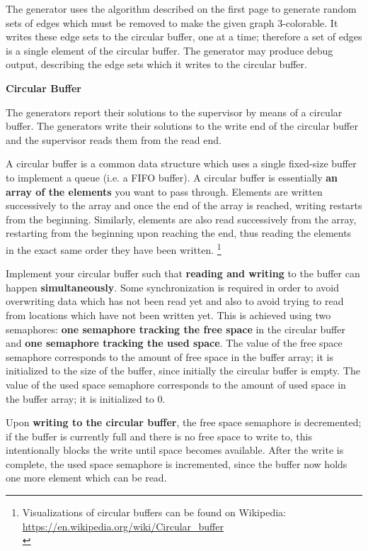 The generator uses the algorithm described on the first page
to generate random sets of edges which must be removed to make the given graph 3-colorable.
It writes these edge sets to the circular buffer, one at a time;
therefore a set of edges is a single element of the circular buffer.
The generator may produce debug output,
describing the edge sets which it writes to the circular buffer.

\clearpage
\textbf{Circular Buffer}

The generators report their solutions to the supervisor by means of a circular buffer.
The generators write their solutions to the write end of the circular buffer
and the supervisor reads them from the read end.

A circular buffer is a common data structure which uses a single fixed-size buffer
to implement a queue (i.e. a FIFO buffer).
A circular buffer is essentially \textbf{an array of the elements} you want to pass through.
Elements are written successively to the array
and once the end of the array is reached, writing restarts from the beginning.
Similarly, elements are also read successively from the array,
restarting from the beginning upon reaching the end,
thus reading the elements in the exact same order they have been written.
\footnote{
Visualizations of circular buffers can be found on Wikipedia:\\
\url{https://en.wikipedia.org/wiki/Circular_buffer}\\
}

Implement your circular buffer such that \textbf{reading and writing} to the buffer
can happen \textbf{simultaneously}.
Some synchronization is required
in order to avoid overwriting data which has not been read yet
and also to avoid trying to read from locations which have not been written yet.
This is achieved using two semaphores:
\textbf{one semaphore tracking the free space} in the circular buffer
and \textbf{one semaphore tracking the used space}.
The value of the free space semaphore corresponds to the amount of free space in the buffer array;
it is initialized to the size of the buffer, since initially the circular buffer is empty.
The value of the used space semaphore corresponds to the amount of used space in the buffer array;
it is initialized to 0.

Upon \textbf{writing to the circular buffer}, the free space semaphore is decremented;
if the buffer is currently full and there is no free space to write to,
this intentionally blocks the write until space becomes available.
After the write is complete, the used space semaphore is incremented,
since the buffer now holds one more element which can be read.

